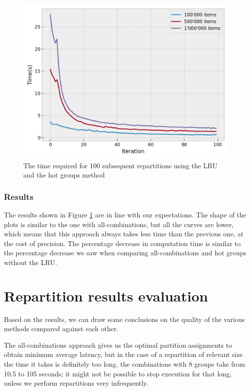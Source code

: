 \begin{figure}[!htb]
  \centering
  \includegraphics[width=\textwidth,height=\textheight,keepaspectratio]{img/LRU_8_hot.png}
  \caption{The time required for 100 subsequent repartitions using the LRU and the hot groups method}
  \label{fig:LRU_8_hot}
\end{figure}

\subsubsection{Results}
The results shown in Figure \ref{fig:LRU_8_hot} are in line with our expectations. The shape of the plots is similar to the one with all-combinations, but all the curves are lower, which means that this approach always takes less time than the previous one, at the cost of precision. The percentage decrease in computation time is similar to the percentage decrease we saw when comparing all-combinations and hot groups without the LRU. 

\section{Repartition results evaluation}\label{sec:repartition-results-evaluation}
Based on the results, we can draw some conclusions on the quality of the various methods compared against each other. 

The all-combinations approach gives us the optimal partition assignments to obtain minimum average latency, but in the case of a repartition of relevant size the time it takes is definitely too long. the combinations with 8 groups take from 10.5 to 105 seconds; it might not be possible to stop execution for that long, unless we perform repartitions very infrequently.

